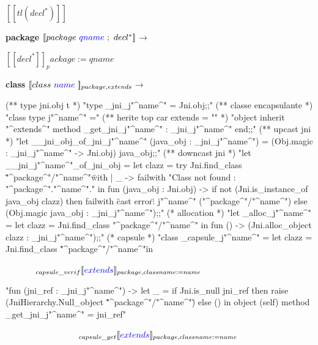 \documentclass[a4paper, 11pt]{report}
\begin{document}
$[\![ tl(decl^*) ]\!]$ 
\newline
\ 
\newline

\textbf{package}
\newline
\noindent
$[\![ package\ {\color{blue}qname}\ ;\ decl^* ]\!]$$\longrightarrow$

$[\![ decl^* ]\!]_package:=qname$ 
\newline
\ 
\newline

\textbf{class}
\newline
\noindent
$[\![ class\ {\color{blue}name}\ ]\!]_{package,extends}$$\longrightarrow$
\begin{OCaml}
(** type jni.obj t *)
"type _jni_j"^name^" = Jni.obj;;"
(** classe encapsulante *)
"class type j"^name^" ="
(** herite top car extends = "" *)
   "object inherit "^extends^" method _get_jni_j"^name^" : _jni_j"^name^"
   end;;"
(** upcast jni *)
"let __jni_obj_of_jni_j"^name^" (java_obj : _jni_j"^name^") =
   (Obj.magic : _jni_j"^name^" -> Jni.obj) java_obj;;"
(** downcast jni *)
"let __jni_j"^name^"_of_jni_obj =
   let clazz =
      try Jni.find_class \""^package^"/"^name^"\"
   with | _ -> failwith "Class not found : "^package^"."^name^"."
   in
      fun (java_obj : Jni.obj) ->
        if not (Jni.is_instance_of java_obj clazz)
        then failwith \"cast error\" : j"^name^" ("^package^"/"^name^")
        else (Obj.magic java_obj : _jni_j"^name^");;"
(* allocation *)
"let _alloc_j"^name^" =
    let clazz = Jni.find_class "^package^"/"^name^"
    in fun () -> (Jni.alloc_object clazz : _jni_j"^name^");;"
(* capsule *)
"class _capsule_j"^name^" =
   let clazz = Jni.find_class \""^package^"/"^name^"\"
   in 
\end{OCaml}
\ \ \ \ \ \ \ $_{capsule\_verif}[\![{\color{blue}extends} ]\!]_{package,classname:=name}$
\begin{OCaml}
      "fun (jni_ref : _jni_j"^name^") ->
        let _ =
          if Jni.is_null jni_ref
          then raise (JniHierarchy.Null_object \""^package^"/"^name^"\")
          else ()
        in
          object (self)
            method _get_jni_j"^name^" = jni_ref"
\end{OCaml}
\ \ \ \ \ \ \ \ \ \ \ \ \ \ \ \ \ $_{capsule\_get}[\![{\color{blue}extends} ]\!]_{package,classname:=name}$
\begin{OCaml}

\end{OCaml}$$
\end{document}
